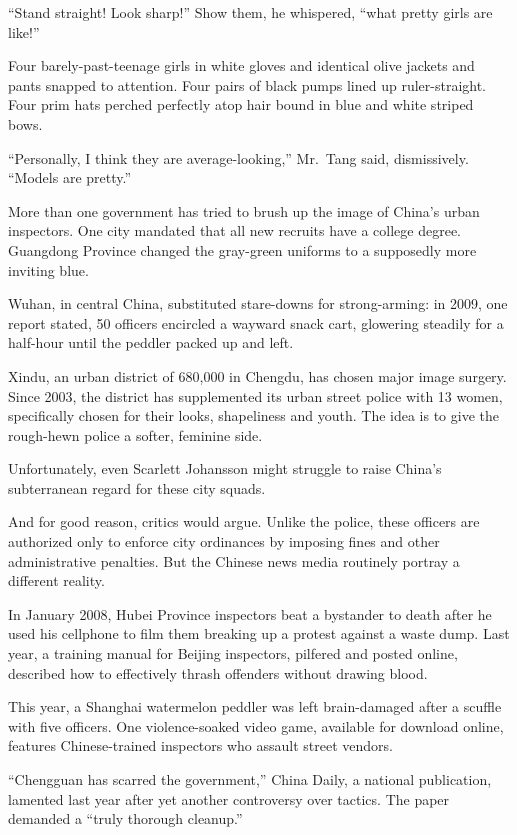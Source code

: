 ﻿\documentclass[12pt]{article}
\begin{document}
``Stand straight! Look sharp!'' Show them, he whispered, ``what pretty girls are like!''

Four barely-past-teenage girls in white gloves and identical olive jackets and pants snapped to
attention. Four pairs of black pumps lined up ruler-straight. Four prim hats perched perfectly atop
hair bound in blue and white striped bows.

``Personally, I think they are average-looking,'' Mr.~Tang said, dismissively. ``Models are
pretty.''

More than one government has tried to brush up the image of China's urban inspectors. One city
mandated that all new recruits have a college degree. Guangdong Province changed the gray-green
uniforms to a supposedly more inviting blue.

Wuhan, in central China, substituted stare-downs for strong-arming: in 2009, one report stated, 50
officers encircled a wayward snack cart, glowering steadily for a half-hour until the peddler packed
up and left.

Xindu, an urban district of 680,000 in Chengdu, has chosen major image surgery. Since 2003, the
district has supplemented its urban street police with 13 women, specifically chosen for their
looks, shapeliness and youth. The idea is to give the rough-hewn police a softer, feminine side.

Unfortunately, even Scarlett Johansson might struggle to raise China's subterranean regard for these
city squads.

And for good reason, critics would argue. Unlike the police, these officers are authorized only to
enforce city ordinances by imposing fines and other administrative penalties. But the Chinese news
media routinely portray a different reality.

In January 2008, Hubei Province inspectors beat a bystander to death after he used his cellphone to
film them breaking up a protest against a waste dump. Last year, a training manual for Beijing
inspectors, pilfered and posted online, described how to effectively thrash offenders without
drawing blood.

This year, a Shanghai watermelon peddler was left brain-damaged after a scuffle with five officers.
One violence-soaked video game, available for download online, features Chinese-trained inspectors
who assault street vendors.

``Chengguan has scarred the government,'' China Daily, a national publication, lamented last year
after yet another controversy over tactics. The paper demanded a ``truly thorough cleanup.''
\end{document}

